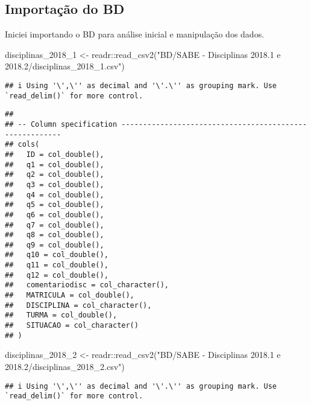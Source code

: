 \documentclass[
]{article}
\newenvironment{Shaded}{\begin{snugshade}}{\end{snugshade}}
\newcommand{\FunctionTok}[1]{\textcolor[rgb]{0.00,0.00,0.00}{#1}}
\newcommand{\NormalTok}[1]{#1}
\newcommand{\OtherTok}[1]{\textcolor[rgb]{0.56,0.35,0.01}{#1}}
\newcommand{\SpecialCharTok}[1]{\textcolor[rgb]{0.00,0.00,0.00}{#1}}
\newcommand{\StringTok}[1]{\textcolor[rgb]{0.31,0.60,0.02}{#1}}
\begin{document}
\hypertarget{importauxe7uxe3o-do-bd}{%
\subsection{Importação do BD}\label{importauxe7uxe3o-do-bd}}

Iniciei importando o BD para análise inicial e manipulação dos dados.

\begin{Shaded}
\begin{Highlighting}[]
\NormalTok{disciplinas\_2018\_1 }\OtherTok{\textless{}{-}}\NormalTok{ readr}\SpecialCharTok{::}\FunctionTok{read\_csv2}\NormalTok{(}\StringTok{"BD/SABE {-} Disciplinas 2018.1 e 2018.2/disciplinas\_2018\_1.csv"}\NormalTok{)  }
\end{Highlighting}
\end{Shaded}

\begin{verbatim}
## i Using '\',\'' as decimal and '\'.\'' as grouping mark. Use `read_delim()` for more control.
\end{verbatim}

\begin{verbatim}
## 
## -- Column specification --------------------------------------------------------
## cols(
##   ID = col_double(),
##   q1 = col_double(),
##   q2 = col_double(),
##   q3 = col_double(),
##   q4 = col_double(),
##   q5 = col_double(),
##   q6 = col_double(),
##   q7 = col_double(),
##   q8 = col_double(),
##   q9 = col_double(),
##   q10 = col_double(),
##   q11 = col_double(),
##   q12 = col_double(),
##   comentariodisc = col_character(),
##   MATRICULA = col_double(),
##   DISCIPLINA = col_character(),
##   TURMA = col_double(),
##   SITUACAO = col_character()
## )
\end{verbatim}

\begin{Shaded}
\begin{Highlighting}[]
\NormalTok{disciplinas\_2018\_2 }\OtherTok{\textless{}{-}}\NormalTok{ readr}\SpecialCharTok{::}\FunctionTok{read\_csv2}\NormalTok{(}\StringTok{"BD/SABE {-} Disciplinas 2018.1 e 2018.2/disciplinas\_2018\_2.csv"}\NormalTok{) }
\end{Highlighting}
\end{Shaded}

\begin{verbatim}
## i Using '\',\'' as decimal and '\'.\'' as grouping mark. Use `read_delim()` for more control.
\end{verbatim}
\end{document}
